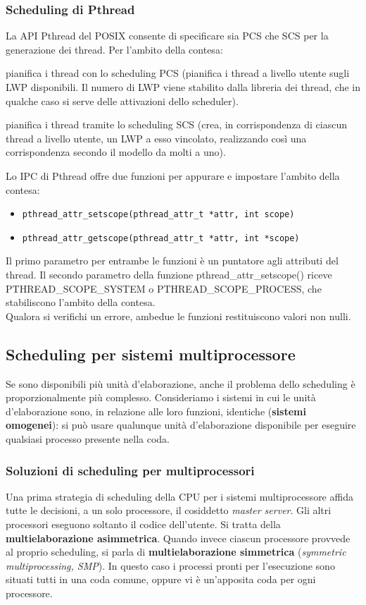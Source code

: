 \documentclass[11pt,a4paper]{article}
\begin{document}
\subsubsection{Scheduling di Pthread}
La API Pthread del POSIX consente di specificare sia PCS che SCS per la generazione dei thread.
Per l'ambito della contesa:
\begin{description}[leftmargin=*]
  \item[PTHREAD\_SCOPE\_PROCESS] pianifica i thread con lo scheduling PCS (pianifica i thread a livello utente sugli LWP disponibili. Il nume­ro di LWP viene stabilito dalla libreria dei thread, che in qualche caso si serve delle attivazio­ni dello scheduler).
  \item [PTHREAD\_SCOPE\_SYSTEM] pianifica i thread tramite lo scheduling SCS (crea, in corri­spondenza di ciascun thread a livello utente, un LWP a esso vincolato, realizzando così una corrispondenza secondo il modello da molti a uno).
\end{description}
%
Lo IPC di Pthread offre due funzioni per appurare e impostare l'ambito della contesa:
\begin{itemize}
  \item \texttt{pthread\_attr\_setscope(pthread\_attr\_t *attr, int scope)}
  \item \texttt{pthread\_attr\_getscope(pthread\_attr\_t *attr, int *scope)}
\end{itemize}
Il primo parametro per entrambe le funzioni è un puntatore agli attributi del thread. Il se­condo parametro della funzione pthread\_attr\_setscope() riceve
PTHREAD\_SCOPE\_SYSTEM o PTHREAD\_SCOPE\_PROCESS, che stabiliscono l'ambito della
contesa.\\
Qualora si verifichi un errore, ambedue le funzioni restituiscono valori non nulli.

\subsection{Scheduling per sistemi multiprocessore}
Se sono disponibili più unità d'elaborazione, anche il problema del­lo scheduling è proporzionalmente più complesso.
Consideriamo i sistemi in cui le unità d'elaborazione sono, in
relazione alle loro funzioni, identiche (\textbf{sistemi omogenei}): si può usare qualunque unità
d'elaborazione disponibile per eseguire qualsiasi processo presente nella coda.

\subsubsection{Soluzioni di scheduling per multiprocessori}
Una prima strategia di scheduling della CPU per i sistemi multiprocessore affida tutte le de­cisioni,  a un solo processore, il cosiddet­to \emph{master server}. Gli altri processori eseguono soltanto il codice dell'utente. Si tratta della \textbf{multielaborazione asimmetrica}.
Quando invece ciascun processore provvede al proprio scheduling, si parla di \textbf{multie­laborazione simmetrica} (\emph{symmetric multiprocessing, SMP}). In questo caso i processi pronti
per l'esecuzione sono situati tutti in una coda comune, oppure vi è un'apposita coda per
ogni processore.
\end{document}
